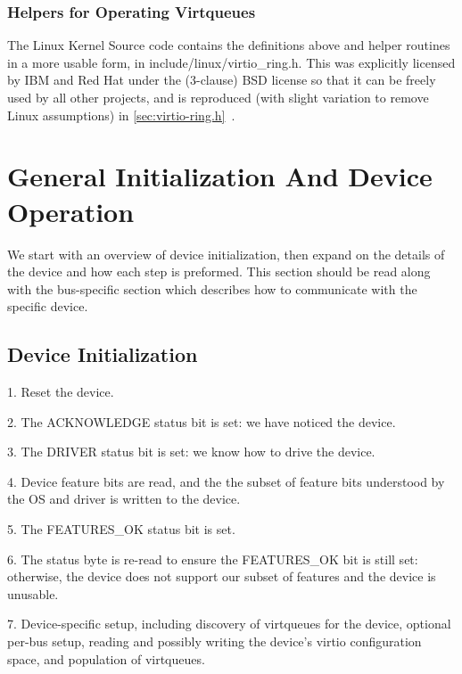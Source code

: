 \subsection{Helpers for Operating Virtqueues}\label{sec:Basic Facilities of a Virtio Device / Virtqueues / Helpers for Operating Virtqueues}

The Linux Kernel Source code contains the definitions above and
helper routines in a more usable form, in
include/linux/virtio_ring.h. This was explicitly licensed by IBM
and Red Hat under the (3-clause) BSD license so that it can be
freely used by all other projects, and is reproduced (with slight
variation to remove Linux assumptions) in \ref{sec:virtio-ring.h}~.

\chapter{General Initialization And Device Operation}\label{sec:General Initialization And Device Operation}

We start with an overview of device initialization, then expand on the
details of the device and how each step is preformed.  This section
should be read along with the bus-specific section which describes
how to communicate with the specific device.

\section{Device Initialization}\label{sec:General Initialization And Device Operation / Device Initialization}

1. Reset the device.

2. The ACKNOWLEDGE status bit is set: we have noticed the device.

3. The DRIVER status bit is set: we know how to drive the device.

4. Device feature bits are read, and the the subset of feature bits
   understood by the OS and driver is written to the device.

5. The FEATURES_OK status bit is set.

6. The status byte is re-read to ensure the FEATURES_OK bit is still
   set: otherwise, the device does not support our subset of features
   and the device is unusable.

7. Device-specific setup, including discovery of virtqueues for the
   device, optional per-bus setup, reading and possibly writing the
   device's virtio configuration space, and population of virtqueues.

